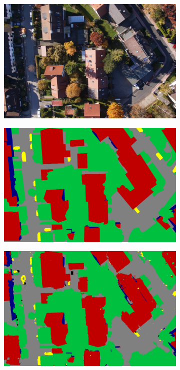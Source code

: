 \begin{figure}[htb]
\begin{subfigure}{0.243\columnwidth}
  \centering
  \includegraphics[width=1\linewidth]{fig/segmentation/DSC00837.JPG}
\end{subfigure}\vspace{1mm}
\begin{subfigure}{0.243\columnwidth}
  \centering
  \includegraphics[width=1\linewidth]{fig/segmentation/DSC00837.png}
\end{subfigure}
\begin{subfigure}{0.243\columnwidth}
  \centering
  \includegraphics[width=1\linewidth]{fig/segmentation/DSC00837_6000_manualcrf.png}

\end{subfigure}
\end{figure}
